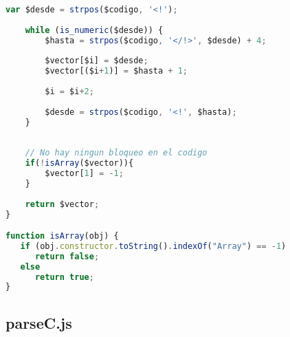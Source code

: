 \begin{lstlisting}[language=Javascript]
	var $desde = strpos($codigo, '<!');
 
	while (is_numeric($desde)) {
		$hasta = strpos($codigo, '</!>', $desde) + 4;
	 
		$vector[$i] = $desde;
		$vector[($i+1)] = $hasta + 1;
	 
		$i = $i+2;
	 
		$desde = strpos($codigo, '<!', $hasta);
	}
 
 
	// No hay ningun bloqueo en el codigo
	if(!isArray($vector)){
		$vector[1] = -1;
	}
 
 	return $vector;
}

function isArray(obj) {
   if (obj.constructor.toString().indexOf("Array") == -1)
      return false;
   else
      return true;
}
\end{lstlisting}

\subsection{parseC.js}

